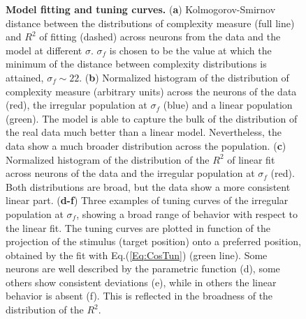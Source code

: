 \documentclass[a4paper]{article}
\begin{document}
\begin{figure}
\centering
{}
\caption{ \textbf{Model fitting and tuning curves.} (\textbf{a}) Kolmogorov-Smirnov distance between the distributions of complexity measure (full line) and $R^2$ of fitting (dashed) across neurons from the data and the model at different $\sigma$. $\sigma_f$ is chosen to be the value at which the minimum of the distance between complexity distributions is attained, $\sigma_f\sim 22$. (\textbf{b}) Normalized histogram of the distribution of complexity measure (arbitrary units) across the neurons of the data (red), the irregular population at $\sigma_f$ (blue) and a linear population (green). The model is able to capture the bulk of the distribution of the real data much better than a linear model. Nevertheless, the data show a much broader distribution across the population. (\textbf{c}) Normalized histogram of the distribution of the $R^2$ of linear fit across neurons of the data and the irregular population at $\sigma_f$ (red). Both distributions are broad, but the data show a more consistent linear part. 
(\textbf{d-f}) Three examples of tuning curves of the irregular population at $\sigma_f$, showing a broad range of behavior with respect to the linear fit. The tuning curves are plotted in function of the projection of the stimulus (target position) onto a preferred position, obtained by the fit with Eq.(\ref{Eq:CosTun}) (green line). Some neurons are well described by the parametric function (d), some others show consistent deviations (e), while in others the linear behavior is absent (f). This is reflected in the broadness of the distribution of the $R^2$.
}
\label{Fig:7}
\end{figure}
 
\end{document}
